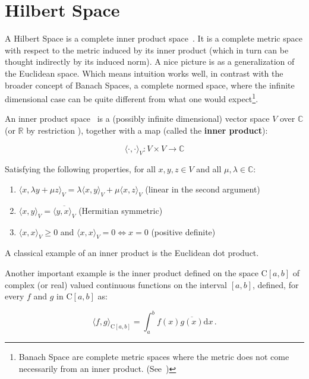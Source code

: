 
\section{Hilbert Space}
\label{s:hilbert}
A Hilbert Space is a complete inner product space~\cite{HS-YN:11}. It is a
complete metric space with respect to the metric induced by its inner product
(which in turn can be thought indirectly by its induced norm). A nice picture
is as a generalization of the Euclidean space. Which means intuition works well,
in contrast with the broader concept of Banach Spaces, a complete normed space,
where the infinite dimensional case can be quite different from what one would
expect\footnote{Banach Space are complete metric spaces where the metric does
not come necessarily from an inner product. (See~\citet{HS-HJNB:00})}.

An inner product space~\cite{HS-HJNB:00} is a (possibly infinite dimensional)
vector space $V$ over $\mathbb{C}$ (or $\mathbb{R}$ by restriction ), together
with a map (called the \textbf{inner product}):

\[  \langle\cdot,\cdot\rangle_{\scriptscriptstyle V}: V \times V \to \mathbb{C}
\]

Satisfying the following properties, for all $x,y,z \in V$ and all $\mu, \lambda
\in \mathbb{C}$:

\begin{enumerate}[I]
  \item \(  \langle x,\lambda y + \mu z  \rangle_{\scriptscriptstyle V} = \lambda\langle	
  x,y\rangle_ {\scriptscriptstyle V} + \mu \langle x,z \rangle_{\scriptscriptstyle V} \) (linear in the second argument)
  \item \( \langle x,y \rangle_{\scriptscriptstyle V} = \overline{\langle y,x \rangle_{\scriptscriptstyle V} } \)
  (Hermitian symmetric)
  \item  \( \langle x,x \rangle_{\scriptscriptstyle V} \geq 0 \) and \( \langle x,x \rangle_{\scriptscriptstyle V} = 0
  \Leftrightarrow x = 0 \) (positive definite)
\end{enumerate}

A classical example of an inner product is the Euclidean dot product.

Another important example is the inner product defined on the space C$[a,b]$ of
complex (or real) valued continuous functions on the interval $[a,b]$, defined,
for every $f$ and $g$ in C$[a,b]$ as:

\begin{equation}\label{eq::func_inner}
  \langle f,g\rangle_{\scriptscriptstyle \text{C}[a,b]} = \int_a^b
  f(x)\overline{g(x)} \mathrm{d}x\,.
\end{equation}

